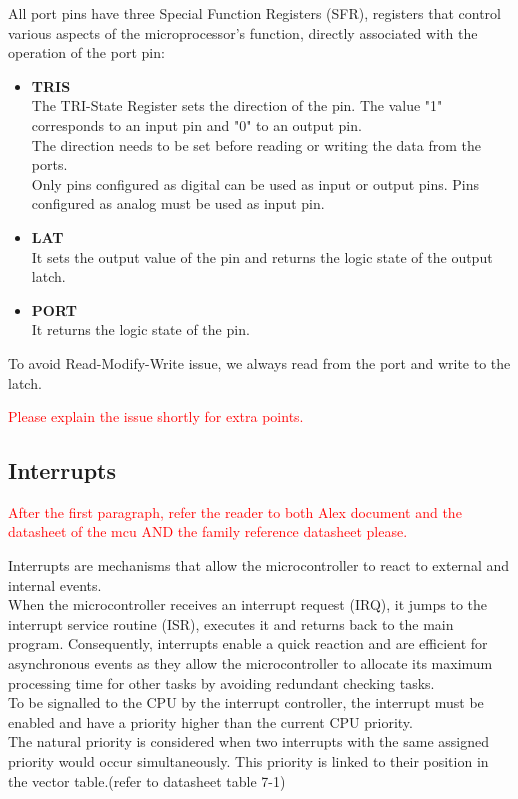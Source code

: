 \noindent
All port pins have three Special Function Registers (SFR), registers that control various aspects of the microprocessor's function, directly associated with the operation of the port pin:
\begin{itemize}
    \item \textbf{TRIS}\\
    The TRI-State Register sets the direction of the pin. The value "1" corresponds to an input pin and "0" to an output pin.\\
    The direction needs to be set before reading or writing the data from the ports. \\
    Only pins configured as digital can be used as input or output pins. Pins configured as analog must be used as input pin.
    \item \textbf{LAT}\\
    It sets the output value of the pin and returns the logic state of the output latch.
    \item \textbf{PORT}\\
    It returns the logic state of the pin. 
\end{itemize}
To avoid Read-Modify-Write issue, we always read from the port and write to the latch.

\textcolor{red}{Please explain the issue shortly for extra points.}

\subsection{Interrupts}

\textcolor{red}{After the first paragraph, refer the reader to both Alex document and the datasheet of the mcu AND the family reference datasheet please.}

Interrupts are mechanisms that allow the microcontroller to react to external and internal events.\\
When the microcontroller receives an interrupt request (IRQ), it jumps to the interrupt service routine (ISR), executes it and returns back to the main program. 
Consequently, interrupts enable a quick reaction and are efficient for asynchronous events as they allow the microcontroller to allocate its maximum processing time for other tasks by avoiding redundant checking tasks.\\

\noindent
To be signalled to the CPU by the interrupt controller, the interrupt must be enabled and have a priority higher than the current CPU priority.\\
The natural priority is considered when two interrupts with the same assigned priority would occur simultaneously. This priority is linked to their position in the vector table.(refer to datasheet table 7-1)

